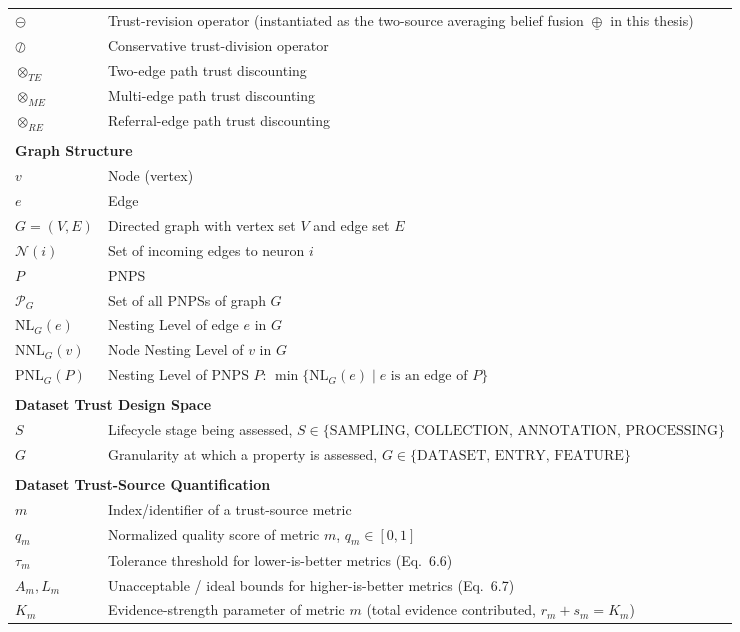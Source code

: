 \begin{longtable}{lp{9cm}}
$\circleddash$ & Trust-revision operator (instantiated as the two-source averaging belief fusion $\underline{\oplus}$ in this thesis) \\
$\oslash$ & Conservative trust-division operator \\
$\otimes_{TE}$ & Two-edge path trust discounting \\
$\otimes_{ME}$ & Multi-edge path trust discounting \\
$\otimes_{RE}$ & Referral-edge path trust discounting \\[4pt]
\hline
\\
\hline
\multicolumn{2}{l}{\textbf{Graph Structure}} \\
$v$ & Node (vertex) \\
$e$ & Edge \\
$G = (V,E)$ & Directed graph with vertex set $V$ and edge set $E$ \\
$\mathcal{N}(i)$ & Set of incoming edges to neuron $i$ \\
$P$ & PNPS \\
$\mathcal{P}_G$ & Set of all PNPSs of graph $G$ \\
$\mathrm{NL}_G(e)$ & Nesting Level of edge $e$ in $G$ \\
$\mathrm{NNL}_G(v)$ & Node Nesting Level of $v$ in $G$ \\
$\mathrm{PNL}_G(P)$ & Nesting Level of PNPS $P$: $\min\{\mathrm{NL}_G(e) \mid e \text{ is an edge of } P\}$ \\[4pt]
\hline
\\
\hline
\multicolumn{2}{l}{\textbf{Dataset Trust Design Space}} \\
$S$ & Lifecycle stage being assessed, $S \in \{\text{SAMPLING, COLLECTION, ANNOTATION, PROCESSING}\}$ \\
$G$ & Granularity at which a property is assessed, $G \in \{\text{DATASET, ENTRY, FEATURE}\}$ \\
\hline
\\
\hline
\multicolumn{2}{l}{\textbf{Dataset Trust-Source Quantification}} \\
$m$ & Index/identifier of a trust-source metric \\
$q_m$ & Normalized quality score of metric $m$, $q_m \in [0,1]$ \\
$\tau_m$ & Tolerance threshold for lower-is-better metrics (Eq.~6.6) \\
$A_m, L_m$ & Unacceptable / ideal bounds for higher-is-better metrics (Eq.~6.7) \\
$K_m$ & Evidence-strength parameter of metric $m$ (total evidence contributed, $r_m+s_m=K_m$) \\

\end{longtable}

